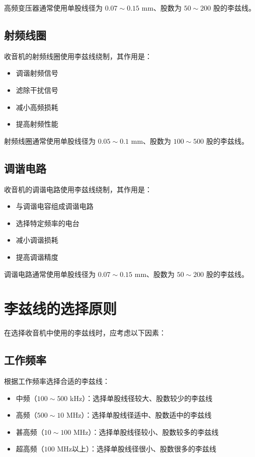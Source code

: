 \documentclass[12pt,UTF8]{ctexbook}
\begin{document}
高频变压器通常使用单股线径为 $0.07 \sim 0.15$ mm、股数为 $50 \sim 200$ 股的李兹线。

\subsection{射频线圈}

收音机的射频线圈使用李兹线绕制，其作用是：

\begin{itemize}[leftmargin=2cm]
    \item 调谐射频信号
    \item 滤除干扰信号
    \item 减小高频损耗
    \item 提高射频性能
\end{itemize}

射频线圈通常使用单股线径为 $0.05 \sim 0.1$ mm、股数为 $100 \sim 500$ 股的李兹线。

\subsection{调谐电路}

收音机的调谐电路使用李兹线绕制，其作用是：

\begin{itemize}[leftmargin=2cm]
    \item 与调谐电容组成调谐电路
    \item 选择特定频率的电台
    \item 减小调谐损耗
    \item 提高调谐精度
\end{itemize}

调谐电路通常使用单股线径为 $0.07 \sim 0.15$ mm、股数为 $50 \sim 200$ 股的李兹线。

\section{李兹线的选择原则}

在选择收音机中使用的李兹线时，应考虑以下因素：

\subsection{工作频率}

根据工作频率选择合适的李兹线：

\begin{itemize}[leftmargin=2cm]
    \item 中频（$100 \sim 500$ kHz）：选择单股线径较大、股数较少的李兹线
    \item 高频（$500 \sim 10$ MHz）：选择单股线径适中、股数适中的李兹线
    \item 甚高频（$10 \sim 100$ MHz）：选择单股线径较小、股数较多的李兹线
    \item 超高频（$100$ MHz以上）：选择单股线径很小、股数很多的李兹线
\end{itemize}
\end{document}
